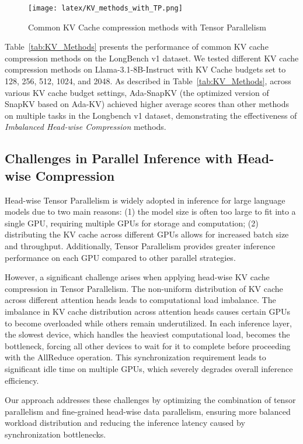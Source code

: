\begin{figure*}[htbp]
    \centering
    \texttt{[image: latex/KV\_methods\_with\_TP.png]}
    \caption{Common KV Cache compression methods with Tensor Parallelism}
    \label{fig:KV_methods_with_TP}
\end{figure*}

Table~\ref{tab:KV_Methods} presents the performance of common KV cache compression methods on the LongBench v1 \cite{bai2024longbenchbilingualmultitaskbenchmark} dataset. We tested different KV cache compression methods on Llama-3.1-8B-Instruct with KV Cache budgets set to 128, 256, 512, 1024, and 2048. As described in Table~\ref{tab:KV_Methods}, across various KV cache budget settings, Ada-SnapKV (the optimized version of SnapKV based on Ada-KV) achieved higher average scores than other methods on multiple tasks in the Longbench v1 dataset, demonstrating the effectiveness of \textit{Imbalanced Head-wise Compression} methods.


\subsection{Challenges in Parallel Inference with Head-wise Compression}

Head-wise Tensor Parallelism is widely adopted in inference for large language models due to two main reasons: (1) the model size is often too large to fit into a single GPU, requiring multiple GPUs for storage and computation; (2) distributing the KV cache across different GPUs allows for increased batch size and throughput. Additionally, Tensor Parallelism provides greater inference performance on each GPU compared to other parallel strategies. 

However, a significant challenge arises when applying head-wise KV cache compression in Tensor Parallelism. The non-uniform distribution of KV cache across different attention heads leads to computational load imbalance. The imbalance in KV cache distribution across attention heads causes certain GPUs to become overloaded while others remain underutilized. In each inference layer, the slowest device, which handles the heaviest computational load, becomes the bottleneck, forcing all other devices to wait for it to complete before proceeding with the AllReduce operation. This synchronization requirement leads to significant idle time on multiple GPUs, which severely degrades overall inference efficiency.

Our approach addresses these challenges by optimizing the combination of tensor parallelism and fine-grained head-wise data parallelism, ensuring more balanced workload distribution and reducing the inference latency caused by synchronization bottlenecks.

